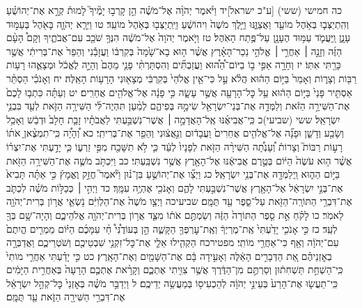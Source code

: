 \documentclass[twoside, openany, parskip=half, 11pt]{book}
\begin{document}
כה חמישי (ששי) [ע"כ ישראל]יד וַיֹּ֨אמֶר יְהֹוָ֜ה אֶל־מֹשֶׁ֗ה הֵ֣ן קָרְב֣וּ יָמֶ֘יךָ֮ לָמוּת֒ קְרָ֣א אֶת־יְהוֹשֻׁ֗עַ וְהִֽתְיַצְּב֛וּ בְּאֹ֥הֶל מוֹעֵ֖ד וַאֲצַוֶּ֑נּוּ וַיֵּ֤לֶךְ מֹשֶׁה֙ וִיהוֹשֻׁ֔עַ וַיִּֽתְיַצְּב֖וּ בְּאֹ֥הֶל מוֹעֵֽד׃ טו וַיֵּרָ֧א יְהֹוָ֛ה בָּאֹ֖הֶל בְּעַמּ֣וּד עָנָ֑ן וַֽיַּעֲמֹ֛ד עַמּ֥וּד הֶעָנָ֖ן עַל־פֶּ֥תַח הָאֹֽהֶל׃ טז וַיֹּ֤אמֶר יְהֹוָה֙ אֶל־מֹשֶׁ֔ה הִנְּךָ֥ שֹׁכֵ֖ב עִם־אֲבֹתֶ֑יךָ וְקָם֩ הָעָ֨ם הַזֶּ֜ה וְזָנָ֣ה ׀ אַחֲרֵ֣י ׀ אֱלֹהֵ֣י נֵכַר־הָאָ֗רֶץ אֲשֶׁ֨ר ה֤וּא בָא־שָׁ֙מָּה֙ בְּקִרְבּ֔וֹ וַעֲזָבַ֕נִי וְהֵפֵר֙ אֶת־בְּרִיתִ֔י אֲשֶׁ֥ר כָּרַ֖תִּי אִתּֽוֹ׃ יז וְחָרָ֣ה אַפִּ֣י ב֣וֹ בַיּוֹם־הַ֠ה֠וּא וַעֲזַבְתִּ֞ים וְהִסְתַּרְתִּ֨י פָנַ֤י מֵהֶם֙ וְהָיָ֣ה לֶאֱכֹ֔ל וּמְצָאֻ֛הוּ רָע֥וֹת רַבּ֖וֹת וְצָר֑וֹת וְאָמַר֙ בַּיּ֣וֹם הַה֔וּא הֲלֹ֗א עַ֣ל כִּי־אֵ֤ין אֱלֹהַי֙ בְּקִרְבִּ֔י מְצָא֖וּנִי הָרָע֥וֹת הָאֵֽלֶּה׃ יח וְאָנֹכִ֗י הַסְתֵּ֨ר אַסְתִּ֤יר פָּנַי֙ בַּיּ֣וֹם הַה֔וּא עַ֥ל כׇּל־הָרָעָ֖ה אֲשֶׁ֣ר עָשָׂ֑ה כִּ֣י פָנָ֔ה אֶל־אֱלֹהִ֖ים אֲחֵרִֽים׃ יט וְעַתָּ֗ה כִּתְב֤וּ לָכֶם֙ אֶת־הַשִּׁירָ֣ה הַזֹּ֔את וְלַמְּדָ֥הּ אֶת־בְּנֵי־יִשְׂרָאֵ֖ל שִׂימָ֣הּ בְּפִיהֶ֑ם לְמַ֨עַן תִּהְיֶה־לִּ֜י הַשִּׁירָ֥ה הַזֹּ֛את לְעֵ֖ד בִּבְנֵ֥י יִשְׂרָאֵֽל׃ ששי (שביעי)כ כִּֽי־אֲבִיאֶ֜נּוּ אֶֽל־הָאֲדָמָ֣ה ׀ אֲשֶׁר־נִשְׁבַּ֣עְתִּי לַאֲבֹתָ֗יו זָבַ֤ת חָלָב֙ וּדְבַ֔שׁ וְאָכַ֥ל וְשָׂבַ֖ע וְדָשֵׁ֑ן וּפָנָ֞ה אֶל־אֱלֹהִ֤ים אֲחֵרִים֙ וַעֲבָד֔וּם וְנִ֣אֲצ֔וּנִי וְהֵפֵ֖ר אֶת־בְּרִיתִֽי׃ כא וְ֠הָיָ֠ה כִּֽי־תִמְצֶ֨אןָ אֹת֜וֹ רָע֣וֹת רַבּוֹת֮ וְצָרוֹת֒ וְ֠עָנְתָ֠ה הַשִּׁירָ֨ה הַזֹּ֤את לְפָנָיו֙ לְעֵ֔ד כִּ֛י לֹ֥א תִשָּׁכַ֖ח מִפִּ֣י זַרְע֑וֹ כִּ֧י יָדַ֣עְתִּי אֶת־יִצְר֗וֹ אֲשֶׁ֨ר ה֤וּא עֹשֶׂה֙ הַיּ֔וֹם בְּטֶ֣רֶם אֲבִיאֶ֔נּוּ אֶל־הָאָ֖רֶץ אֲשֶׁ֥ר נִשְׁבַּֽעְתִּי׃ כב וַיִּכְתֹּ֥ב מֹשֶׁ֛ה אֶת־הַשִּׁירָ֥ה הַזֹּ֖את בַּיּ֣וֹם הַה֑וּא וַֽיְלַמְּדָ֖הּ אֶת־בְּנֵ֥י יִשְׂרָאֵֽל׃ כג וַיְצַ֞ו אֶת־יְהוֹשֻׁ֣עַ בִּן־נ֗וּן וַיֹּ֘אמֶר֮ חֲזַ֣ק וֶאֱמָץ֒ כִּ֣י אַתָּ֗ה תָּבִיא֙ אֶת־בְּנֵ֣י יִשְׂרָאֵ֔ל אֶל־הָאָ֖רֶץ אֲשֶׁר־נִשְׁבַּ֣עְתִּי לָהֶ֑ם וְאָנֹכִ֖י אֶהְיֶ֥ה עִמָּֽךְ׃ כד וַיְהִ֣י ׀ כְּכַלּ֣וֹת מֹשֶׁ֗ה לִכְתֹּ֛ב אֶת־דִּבְרֵ֥י הַתּוֹרָֽה־הַזֹּ֖את עַל־סֵ֑פֶר עַ֖ד תֻּמָּֽם׃ שביעיכה וַיְצַ֤ו מֹשֶׁה֙ אֶת־הַלְוִיִּ֔ם נֹ֥שְׂאֵ֛י אֲר֥וֹן בְּרִית־יְהֹוָ֖ה לֵאמֹֽר׃ כו לָקֹ֗חַ אֵ֣ת סֵ֤פֶר הַתּוֹרָה֙ הַזֶּ֔ה וְשַׂמְתֶּ֣ם אֹת֔וֹ מִצַּ֛ד אֲר֥וֹן בְּרִית־יְהֹוָ֖ה אֱלֹהֵיכֶ֑ם וְהָיָה־שָׁ֥ם בְּךָ֖ לְעֵֽד׃ כז כִּ֣י אָנֹכִ֤י יָדַ֙עְתִּי֙ אֶֽת־מֶרְיְךָ֔ וְאֶֽת־עׇרְפְּךָ֖ הַקָּשֶׁ֑ה הֵ֣ן בְּעוֹדֶ֩נִּי֩ חַ֨י עִמָּכֶ֜ם הַיּ֗וֹם מַמְרִ֤ים הֱיִתֶם֙ עִם־יְהֹוָ֔ה וְאַ֖ף כִּי־אַחֲרֵ֥י מוֹתִֽי׃ מפטירכח הַקְהִ֧ילוּ אֵלַ֛י אֶת־כׇּל־זִקְנֵ֥י שִׁבְטֵיכֶ֖ם וְשֹׁטְרֵיכֶ֑ם וַאֲדַבְּרָ֣ה בְאׇזְנֵיהֶ֗ם אֵ֚ת הַדְּבָרִ֣ים הָאֵ֔לֶּה וְאָעִ֣ידָה בָּ֔ם אֶת־הַשָּׁמַ֖יִם וְאֶת־הָאָֽרֶץ׃ כט כִּ֣י יָדַ֗עְתִּי אַחֲרֵ֤י מוֹתִי֙ כִּֽי־הַשְׁחֵ֣ת תַּשְׁחִת֔וּן וְסַרְתֶּ֣ם מִן־הַדֶּ֔רֶךְ אֲשֶׁ֥ר צִוִּ֖יתִי אֶתְכֶ֑ם וְקָרָ֨את אֶתְכֶ֤ם הָרָעָה֙ בְּאַחֲרִ֣ית הַיָּמִ֔ים כִּֽי־תַעֲשׂ֤וּ אֶת־הָרַע֙ בְּעֵינֵ֣י יְהֹוָ֔ה לְהַכְעִיס֖וֹ בְּמַעֲשֵׂ֥ה יְדֵיכֶֽם׃
ל וַיְדַבֵּ֣ר מֹשֶׁ֗ה בְּאׇזְנֵי֙ כׇּל־קְהַ֣ל יִשְׂרָאֵ֔ל אֶת־דִּבְרֵ֥י הַשִּׁירָ֖ה הַזֹּ֑את עַ֖ד תֻּמָּֽם׃
\end{document}
